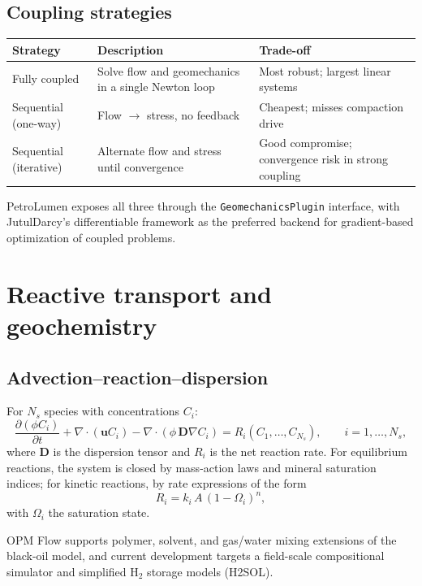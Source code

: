 \documentclass[10pt,a4paper]{article}
\newcommand{\pd}[2]{\frac{\partial #1}{\partial #2}}
\newcommand{\grad}{\nabla}
\newcommand{\divv}{\nabla\cdot}
\begin{document}
\subsection{Coupling strategies}

\begin{longtable}{@{}p{3.0cm}p{5.0cm}p{5.8cm}@{}}
\toprule
\textbf{Strategy} & \textbf{Description} & \textbf{Trade-off}\\
\midrule
\endhead
Fully coupled & Solve flow and geomechanics in a single Newton loop & Most robust; largest linear systems\\
Sequential (one-way) & Flow $\to$ stress, no feedback & Cheapest; misses compaction drive\\
Sequential (iterative) & Alternate flow and stress until convergence & Good compromise; convergence risk in strong coupling\\
\bottomrule
\end{longtable}

PetroLumen exposes all three through the \texttt{GeomechanicsPlugin} interface,
with JutulDarcy's differentiable framework as the preferred backend for
gradient-based optimization of coupled problems.

\section{Reactive transport and geochemistry}

\subsection{Advection--reaction--dispersion}

For $N_s$ species with concentrations $C_i$:
\begin{equation}
  \pd{(\phi C_i)}{t}
  + \divv(\bm{u} C_i)
  - \divv(\phi\,\bm{D}\grad C_i)
  = R_i(C_1,\dots,C_{N_s}),
  \qquad i=1,\dots,N_s,
  \label{eq:reactive}
\end{equation}
where $\bm{D}$ is the dispersion tensor and $R_i$ is the net reaction rate.
For equilibrium reactions, the system is closed by mass-action laws and
mineral saturation indices; for kinetic reactions, by rate expressions of the
form
\begin{equation}
  R_i = k_i\,A\,(1-\Omega_i)^{n},
  \label{eq:kinetic}
\end{equation}
with $\Omega_i$ the saturation state.

OPM Flow supports polymer, solvent, and gas/water mixing extensions of the
black-oil model, and current development targets a field-scale compositional
simulator and simplified $\mathrm{H_2}$ storage models (H2SOL).
\end{document}
